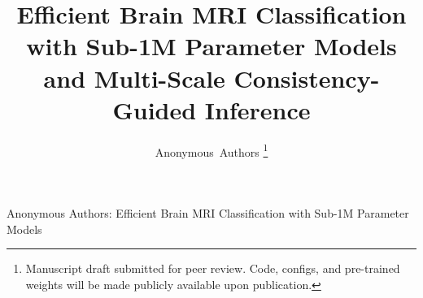 \documentclass[journal]{IEEEtran}
\begin{document}
\title{Efficient Brain MRI Classification with Sub-1M Parameter Models and Multi-Scale Consistency-Guided Inference}

\author{Anonymous~Authors%
\thanks{Manuscript draft submitted for peer review. Code, configs, and pre-trained weights will be made publicly available upon publication.}}

%
{Anonymous Authors: Efficient Brain MRI Classification with Sub-1M Parameter Models}

\maketitle


\IEEEpeerreviewmaketitle








\end{document}
